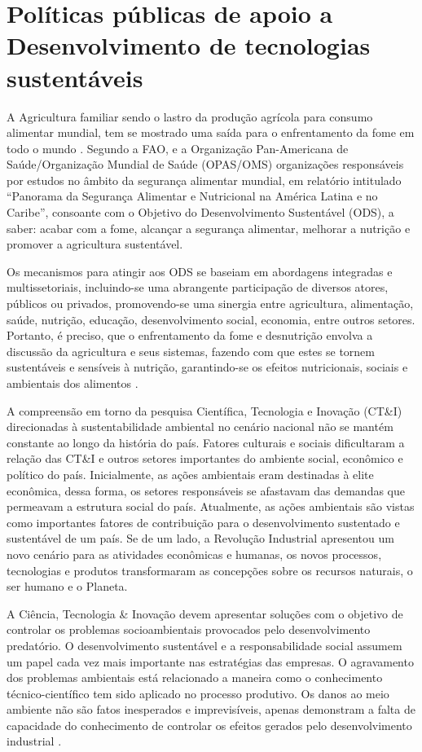 \section{Políticas públicas de apoio a Desenvolvimento de tecnologias sustentáveis}

A Agricultura familiar sendo o lastro da produção agrícola para consumo alimentar mundial, tem se mostrado uma saída para o enfrentamento da fome em todo o mundo \cite{fao_innovation_2014}. Segundo a FAO, e a Organização Pan-Americana de Saúde/Organização Mundial de Saúde (OPAS/OMS) \cite{fao_panorama_2017} organizações responsáveis por estudos no âmbito da segurança alimentar mundial, em relatório intitulado “Panorama da Segurança Alimentar e Nutricional na América Latina e no Caribe”, consoante com o Objetivo do Desenvolvimento Sustentável (ODS), a saber: acabar com a fome, alcançar a segurança alimentar, melhorar a nutrição e promover a agricultura sustentável. 

Os mecanismos para atingir aos ODS se baseiam em abordagens integradas e multissetoriais, incluindo-se uma abrangente participação de diversos atores, públicos ou privados, promovendo-se uma sinergia entre agricultura, alimentação, saúde, nutrição, educação, desenvolvimento social, economia, entre outros setores. Portanto, é preciso, que o enfrentamento da fome e desnutrição envolva a discussão da agricultura e seus sistemas, fazendo com que estes se tornem sustentáveis e sensíveis à nutrição, garantindo-se os efeitos nutricionais, sociais e ambientais dos alimentos \cite{silva_agenda_2018}.


A compreensão em torno da pesquisa Científica, Tecnologia e Inovação (CT\&I) direcionadas à sustentabilidade ambiental no cenário nacional não se mantém constante ao longo da história do país. Fatores culturais e sociais dificultaram a relação das CT\&I e outros setores importantes do ambiente social, econômico e político do país. Inicialmente, as ações ambientais eram destinadas à elite econômica, dessa forma, os setores responsáveis se afastavam das demandas que permeavam a estrutura social do país. Atualmente, as ações ambientais são vistas como importantes fatores de contribuição para o desenvolvimento sustentado e sustentável de um país. Se de um lado, a Revolução Industrial apresentou um novo cenário para as atividades econômicas e humanas, os novos processos, tecnologias e produtos transformaram as concepções sobre os recursos naturais, o ser humano e o Planeta.

A Ciência, Tecnologia \& Inovação devem apresentar soluções com o objetivo de controlar os problemas socioambientais provocados pelo desenvolvimento predatório. O desenvolvimento sustentável e a responsabilidade social assumem um papel cada vez mais importante nas estratégias das empresas. O agravamento dos problemas ambientais está relacionado a maneira como o conhecimento técnico-científico tem sido aplicado no processo produtivo. Os danos ao meio ambiente não são fatos inesperados e imprevisíveis, apenas demonstram a falta de capacidade do conhecimento de controlar os efeitos gerados pelo desenvolvimento industrial \cite{maranhao_dinamica_2016}.


